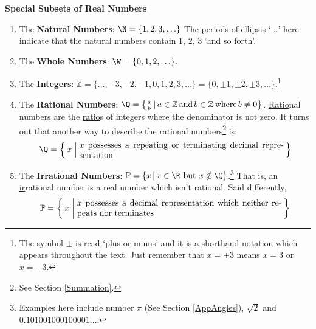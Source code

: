 \colorbox{ResultColor}{\bbm

\centerline{\textbf{Special Subsets of Real Numbers}}

\begin{enumerate}

\item The \textbf{Natural Numbers}: $\N= \{ 1, 2, 3,  \ldots\}$ The periods of ellipsis `$\ldots$' here indicate that the natural numbers contain $1$, $2$, $3$ `and so forth'.

\item The \textbf{Whole Numbers}: $\W = \{ 0, 1, 2, \ldots \}.$

\item The \textbf{Integers}: $\mathbb Z=\{ \ldots, -3, -2, -1, 0, 1, 2, 3, \ldots \} = \{ 0, \pm 1, \pm 2, \pm 3, \ldots\}.$\footnote{The symbol $\pm$ is read `plus or minus' and it is a shorthand notation which appears throughout the text.  Just remember that $x = \pm 3$ means $x = 3$ or $x = -3$.}

\item The \textbf{Rational Numbers}: $\Q=\left\{\frac{a}{b} \, | \, a \in \mathbb Z \, \mbox{and} \, b \in \mathbb Z \, \mbox{where} \, b \neq 0\right\}$.  \underline{Ratio}nal numbers are the \underline{ratio}s of integers where the denominator is not zero.  It turns out that another way to describe the rational numbers\footnote{See Section \ref{Summation}.} is: \[\Q=\Set{x | \parbox{0.7\linewidth}{$x$ possesses a repeating or terminating decimal representation}}\]

\item The \textbf{Irrational Numbers}: $\mathbb P = \{x\,|\,\mbox{$x \in \R$ but $x \notin \Q$}\}$.\footnote{Examples here include number $\pi$ (See Section \ref{AppAngles}), $\sqrt{2}$ and $0.101001000100001\ldots$.}  That is, an \underline{ir}rational number is a real number which isn't rational.  Said differently, \[\mathbb P = \Set{x | \parbox{0.7\linewidth}{$x$ possesses a decimal representation which neither repeats nor terminates}}\]

\end{enumerate}

\ebm}

